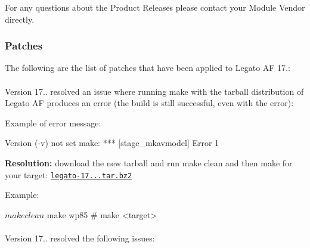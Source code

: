 For any questions about the Product Releases please contact your Module Vendor directly.\hypertarget{releaseNotes17072_rn107_07_Patches}{}\subsubsection{Patches}\label{releaseNotes17072_rn107_07_Patches}
The following are the list of patches that have been applied to Legato AF 17.\+:\hypertarget{_}{}\paragraph{}\label{_}
Version 17.. resolved an issue where running {\ttfamily make} with the tarball distribution of Legato AF produces an error (the build is still successful, even with the error)\+:

Example of error message\+: \begin{DoxyVerb}Version (-v) not set
make: *** [stage_mkavmodel] Error 1
\end{DoxyVerb}


{\bfseries Resolution\+:} download the new tarball and run {\ttfamily make} {\ttfamily clean} and then {\ttfamily make} for your target\+: \href{https://downloads.sierrawireless.com/legato/1707/legato-17.07.1.tar.bz2}{\tt legato-\/17...\+tar.\+bz2}

Example\+: \begin{DoxyVerb}$ make clean
$ make wp85           # make <target>
\end{DoxyVerb}
\hypertarget{_}{}\paragraph{}\label{_}
Version 17.. resolved the following issues\+:


